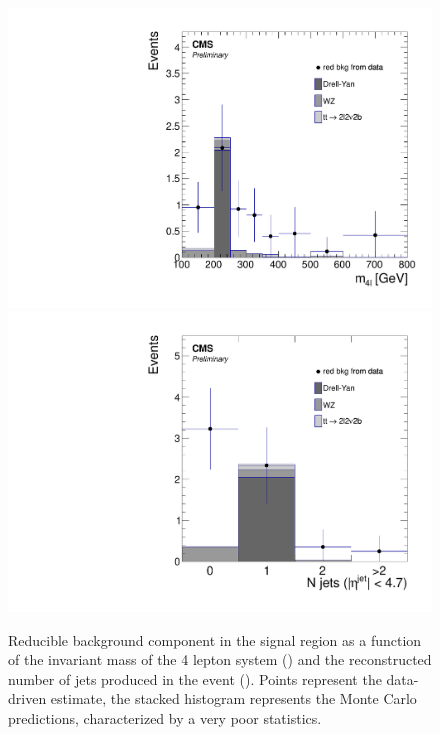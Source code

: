 \begin{figure}[hbtp]
  \begin{center}
    \includegraphics[width=\cmsFigWidth]{Figures/Mass_red}
    \includegraphics[width=\cmsFigWidth]{Figures/Jets_red}
     \caption{Reducible background component in the signal region as a function of the invariant mass of the 4 lepton system (\cmsLeft) and the reconstructed number of jets produced in the event (\cmsRight). Points represent the data-driven estimate, the stacked histogram represents the Monte Carlo predictions, characterized by a very poor statistics.}
    \label{fig:red_bkg}
  \end{center}
\end{figure}
